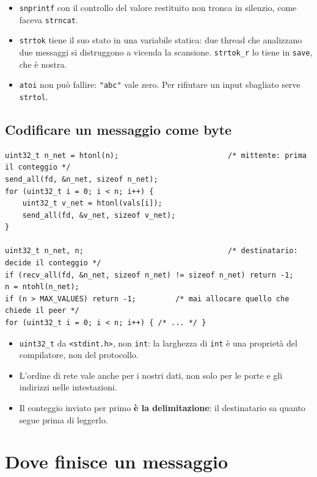 \begin{itemize}
    \item \texttt{snprintf} con il controllo del valore restituito non tronca in silenzio, come faceva \texttt{strncat}.
    \item \texttt{strtok} tiene il suo stato in una variabile statica: due thread che analizzano due messaggi si distruggono
          a vicenda la scansione. \texttt{strtok\_r} lo tiene in \texttt{save}, che è nostra.
    \item \texttt{atoi} non può fallire: \texttt{"abc"} vale zero. Per rifiutare un input sbagliato serve \texttt{strtol}.
\end{itemize}

\subsection{Codificare un messaggio come byte}

\begin{lstlisting}[language={[POSIX]C}, style=wnumbers, title={Prima il conteggio, poi i valori}]
uint32_t n_net = htonl(n);                         /* mittente: prima il conteggio */
send_all(fd, &n_net, sizeof n_net);
for (uint32_t i = 0; i < n; i++) {
    uint32_t v_net = htonl(vals[i]);
    send_all(fd, &v_net, sizeof v_net);
}

uint32_t n_net, n;                                 /* destinatario: decide il conteggio */
if (recv_all(fd, &n_net, sizeof n_net) != sizeof n_net) return -1;
n = ntohl(n_net);
if (n > MAX_VALUES) return -1;         /* mai allocare quello che chiede il peer */
for (uint32_t i = 0; i < n; i++) { /* ... */ }
\end{lstlisting}

\begin{itemize}
    \item \texttt{uint32\_t} da \texttt{<stdint.h>}, non \texttt{int}: la larghezza di \texttt{int} è una proprietà del
          compilatore, non del protocollo.
    \item L'ordine di rete vale anche per i nostri dati, non solo per le porte e gli indirizzi nelle intestazioni.
    \item Il conteggio inviato per primo \textbf{è la delimitazione}: il destinatario sa quanto segue prima di leggerlo.
\end{itemize}

\section{Dove finisce un messaggio}

